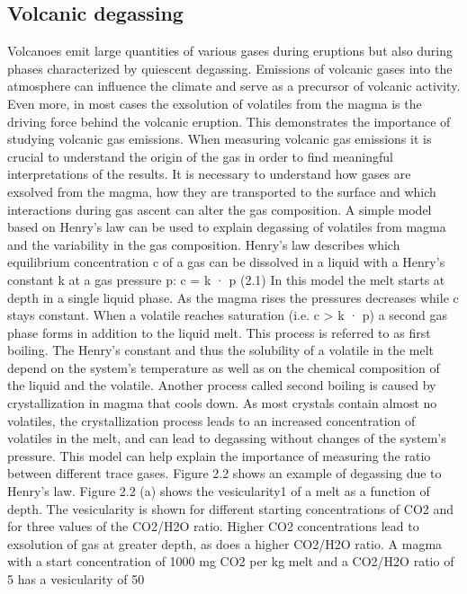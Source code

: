 \documentclass  [
  paper    = a4,
  BCOR     = 10mm,
  twoside,
  fontsize = 12pt,
  fleqn,
  toc      = bibnumbered,
  toc      = listofnumbered,
  numbers  = noendperiod,
  headings = normal,
  listof   = leveldown,
  version  = 3.03
]                                       {scrreprt}
\begin{document}
	\subsection{Volcanic degassing}
	Volcanoes emit large quantities of various gases during eruptions but also during
	phases characterized by quiescent degassing. Emissions of volcanic gases into the
	atmosphere can influence the climate and serve as a precursor of volcanic activity.
	Even more, in most cases the exsolution of volatiles from the magma is the
	driving force behind the volcanic eruption. This demonstrates the importance of
	studying volcanic gas emissions.
	When measuring volcanic gas emissions it is crucial to understand the origin of
	the gas in order to find meaningful interpretations of the results. It is necessary to
	understand how gases are exsolved from the magma, how they are transported to
	the surface and which interactions during gas ascent can alter the gas composition.
	A simple model based on Henry’s law can be used to explain degassing of volatiles
	from magma and the variability in the gas composition. Henry’s law describes
	which equilibrium concentration c of a gas can be dissolved in a liquid with a
	Henry’s constant k at a gas pressure p:
	c = k · p (2.1)
	In this model the melt starts at depth in a single liquid phase. As the magma
	rises the pressures decreases while c stays constant. When a volatile reaches
	saturation (i.e. c > k · p) a second gas phase forms in addition to the liquid melt.
	This process is referred to as first boiling. The Henry’s constant and thus the
	solubility of a volatile in the melt depend on the system’s temperature as well
	as on the chemical composition of the liquid and the volatile. Another process
	called second boiling is caused by crystallization in magma that cools down. As
	most crystals contain almost no volatiles, the crystallization process leads to
	an increased concentration of volatiles in the melt, and can lead to degassing
	without changes of the system’s pressure.
	This model can help explain the importance of measuring the ratio between
	different trace gases. Figure 2.2 shows an example of degassing due to Henry’s
	law. Figure 2.2 (a) shows the vesicularity1 of a melt as a function of depth. The
	vesicularity is shown for different starting concentrations of CO2 and for three
	values of the CO2/H2O ratio. Higher CO2 concentrations lead to exsolution of
	gas at greater depth, as does a higher CO2/H2O ratio. A magma with a start
	concentration of 1000 mg CO2 per kg melt and a CO2/H2O ratio of 5 has a
	vesicularity of 50%
\end{document}
